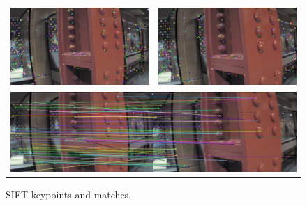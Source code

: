 \documentclass{acmsiggraph}
\begin{document}
\begin{figure}[h]
  \centering
  \begin{tabular}{cc}
    \includegraphics[resolution=150, scale=0.75]{images/sift-kp1} &
    \includegraphics[resolution=150, scale=0.75]{images/sift-kp2} \\
    \multicolumn{2}{c}{\includegraphics[resolution=150, scale=0.75]{images/sift-matches}}
  \end{tabular}
  \caption{SIFT keypoints and matches.}
  \label{fig:sift-ex}
\end{figure}
\end{document}
